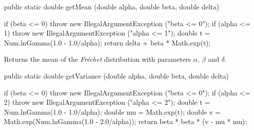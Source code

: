 %
\begin{code}

   public static double getMean (double alpha, double beta, double delta)\begin{hide} {
      if (beta <= 0)
         throw new IllegalArgumentException ("beta <= 0");
      if (alpha <= 1)
         throw new IllegalArgumentException ("alpha <= 1");
      double t = Num.lnGamma(1.0 - 1.0/alpha);
      return delta + beta * Math.exp(t);
   }\end{hide}
\end{code}
\begin{tabb}  Returns the mean of the \emph{Fr\'echet} distribution with
 parameters $\alpha$, $\beta$ and $\delta$.
\end{tabb}
\begin{htmlonly}
\end{htmlonly}
\begin{code}

   public static double getVariance (double alpha, double beta,
                                     double delta)\begin{hide} {
      if (beta <= 0)
         throw new IllegalArgumentException ("beta <= 0");
      if (alpha <= 2)
         throw new IllegalArgumentException ("alpha <= 2");
      double t = Num.lnGamma(1.0 - 1.0/alpha);
      double mu = Math.exp(t);
      double v = Math.exp(Num.lnGamma(1.0 - 2.0/alpha));
      return beta * beta * (v - mu * mu);
   }\end{hide}
\end{code}
